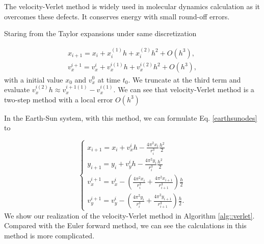 The velocity-Verlet method is widely used in molecular dynamics calculation as it overcomes these defects. It conserves energy with small round-off errors\cite{toxvaerd2012energy}.

Staring from the Taylor expansions under same discretization

\begin{equation}
	\begin{aligned}
		x_{i+1} = x_i + x_i^{(1)}h + x_i^{(2)}h^2 + O(h^3),\\
		v_x^{i+1} = v_x^{i} + v_x^{i(1)}h + v_x^{i(2)}h^2 + O(h^3),
	\end{aligned}
\end{equation}
with a initial value $x_0$ and $v_x^0$ at time $t_0$. We truncate at the third term and evaluate $v_x^{i(2)}h \approx v_x^{i+1(1)}-v_x^{i(1)}$. We can see that velocity-Verlet method is a two-step method with a local error $O(h^3)$

In the Earth-Sun system, with this method, we can formulate Eq. \ref{earthsunodes} to

\begin{equation}
	\left\{  
             \begin{array}{lr}  
             	x_{i+1} = x_i + v_x^{i}h - \frac{4\pi^2x_i}{r_i^3}\frac{h^2}{2} \\
				y_{i+1} = y_i + v_y^{i}h - \frac{4\pi^2y_i}{r_i^3}\frac{h^2}{2} \\
             	v_x^{i+1} = v_x^{i} - (\frac{4\pi^2x_i}{r_i^3}+\frac{4\pi^2x_{i+1}}{r_{i+1}^3})\frac{h}{2}\\
             	v_y^{i+1} = v_y^{i} - (\frac{4\pi^2y_i}{r_i^3}+\frac{4\pi^2y_{i+1}}{r_{i+1}^3})\frac{h}{2}.
			\end{array}  
	\right.	
\end{equation} 
We show our realization of the velocity-Verlet method in Algorithm \ref{alg::verlet}. Compared with the Euler forward method, we can see the calculations in this method is more complicated.

